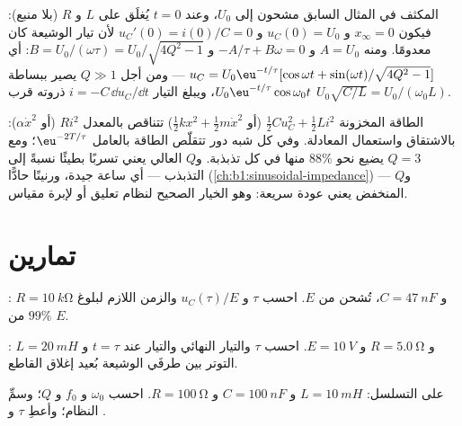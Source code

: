 \begin{example}\label{ex:b1:transient-regimes:ic}
المكثف في المثال السابق مشحون إلى $U_0$، وعند
$t = 0$ يُغلَق على $L$ و $R$ (بلا منبع): فيكون $x_\infty = 0$ و
$u_C(0) = U_0$ و $u_C'(0) = i(0)/C = 0$ لأن تيار الوشيعة كان معدومًا.
ومنه $A = U_0$ و $-A/\tau + B\omega = 0$ و $B = U_0/(\omega\tau) =
U_0/\sqrt{4Q^2 - 1}$: أي $u_C = U_0\eu^{-t/\tau}[\cos\omega t + \sin(\omega
t)/\sqrt{4Q^2 - 1}]$ --- ومن أجل $Q \gg 1$ يصير ببساطة $U_0\eu^{-t/\tau}\cos\omega_0 t$،
ويبلغ التيار $i = -C\,\dd u_C/\dd t$ ذروته قرب $U_0\sqrt{C/L} =
U_0/(\omega_0 L)$.
\end{example}

\begin{remark}[الطاقة]\label{rem:b1:transient-regimes:energy}
الطاقة المخزونة $\tfrac12 Cu_C^2 + \tfrac12 Li^2$ (أو $\tfrac12 kx^2
+ \tfrac12 m\dot x^2$) تتناقص بالمعدل $Ri^2$ (أو $\alpha\dot x^2$):
بالاشتقاق واستعمال المعادلة. وفي كل شبه دور تتقلّص الطاقة
بالعامل $\eu^{-2T/\tau}$؛ ومع $Q = 3$ يضيع نحو $88\%$ منها
في كل تذبذبة. و$Q$ العالي يعني تسربًا بطيئًا نسبةً إلى
التذبذب --- أي ساعة جيدة، ورنينًا حادًّا
(\cref{ch:b1:sinusoidal-impedance}) --- و$Q$ المنخفض يعني عودة سريعة:
وهو الخيار الصحيح لنظام تعليق أو لإبرة مقياس.
\end{remark}

\section{تمارين}

\begin{exercise}[$\star$]\label{exo:b1:transient-regimes:1}
: $R = \qty{10}{k\ohm}$ و $C = \qty{47}{nF}$، تُشحن من
$E$. احسب $\tau$ و $u_C(\tau)/E$ والزمن اللازم لبلوغ $99\%$ من $E$.
\end{exercise}

\begin{exercise}[$\star$]\label{exo:b1:transient-regimes:2}
: $L = \qty{20}{mH}$ و $R = \qty{5.0}{\ohm}$ و $E = \qty{10}{V}$.
احسب $\tau$ والتيار النهائي والتيار عند $t = \tau$ و
التوتر بين طرفَي الوشيعة بُعيد إغلاق القاطع.
\end{exercise}

\begin{exercise}[$\star$]\label{exo:b1:transient-regimes:3}
 على التسلسل: $L = \qty{10}{mH}$ و $C = \qty{100}{nF}$ و $R = \qty{100}{\ohm}$.
احسب $\omega_0$ و $f_0$ و $Q$؛ وسمِّ النظام؛ وأعطِ $\tau$ و
.
\end{exercise}

